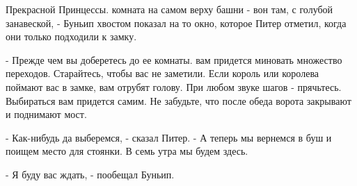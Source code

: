 Прекрасной Принцессы.
 комната на самом верху башни - вон там, с голубой занавеской, - 
Буньип хвостом показал на то окно, которое Питер отметил, когда они 
только подходили к замку.
\par- Прежде чем вы доберетесь до ее комнаты. вам придется миновать 
множество переходов. Старайтесь, чтобы вас не заметили. Если король 
или королева поймают вас в замке, вам отрубят голову. При любом звуке 
шагов - прячьтесь. Выбираться вам придется самим. Не забудьте, что 
после обеда ворота закрывают и поднимают мост.
\par- Как-нибудь да выберемся, - сказал Питер. - А теперь мы вернемся 
в буш и поищем место для стоянки. В семь утра мы будем здесь.
\par- Я буду вас ждать, - пообещал Буньип.
